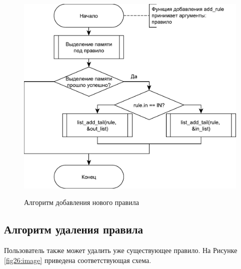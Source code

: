 \begin{figure}[h!]
	\begin{center}
		{\includegraphics[scale = 0.6]{img/add_rule.pdf}}
		\caption{Алгоритм добавления нового правила}
		\label{fig25:image}
	\end{center}
\end{figure}

\newpage

\subsection{Алгоритм удаления правила}
Пользователь также может удалить уже существующее правило. На Рисунке \ref{fig26:image} приведена соответствующая схема.

